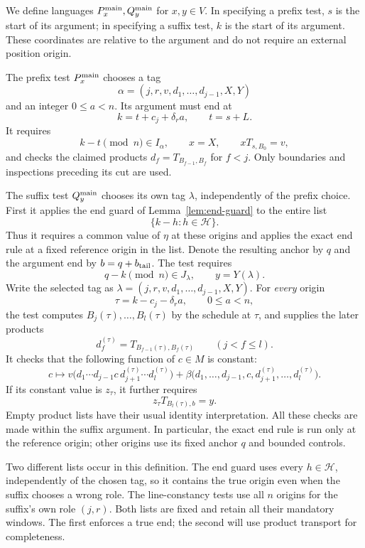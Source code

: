 We define languages $P_x^{\rm main},Q_y^{\rm main}$ for $x,y\in V$.
In specifying a prefix test, $s$ is the start of its argument; in specifying
a suffix test, $k$ is the start of its argument.  These coordinates are
relative to the argument and do not require an external position origin.

The prefix test $P_x^{\rm main}$ chooses a tag
\[
 \alpha=(j,r,v,d_1,\ldots,d_{j-1},X,Y)
\]
and an integer $0\leq a<n$.  Its argument must end at
\[
 k=t+c_j+\delta_r a,\qquad t=s+L.
\]
It requires
\[
 k-t\pmod n\in I_\alpha,\qquad x=X,\qquad xT_{s,B_0}=v,
\]
and checks the claimed products $d_f=T_{B_{f-1},B_f}$ for $f<j$.
Only boundaries and inspections preceding its cut are used.

The suffix test $Q_y^{\rm main}$ chooses its own tag $\lambda$,
independently of the prefix choice.  First it applies the end guard of
Lemma~\ref{lem:end-guard} to the entire list
\[
 \{k-h:h\in\mathcal H\}.
\]
Thus it requires a common value of $\eta$ at these origins and applies
the exact end rule at a fixed reference origin in the list.  Denote the
resulting anchor by $q$ and the argument end by $b=q+b_{\rm tail}$.
The test requires
\[
 q-k\pmod n\in J_\lambda,\qquad y=Y(\lambda).
\]
Write the selected tag as
$\lambda=(j,r,v,d_1,\ldots,d_{j-1},X,Y)$.
For \emph{every} origin
\[
 \tau=k-c_j-\delta_r a,\qquad 0\leq a<n,
\]
the test computes $B_j(\tau),\ldots,B_l(\tau)$ by the schedule at
$\tau$, and supplies the later products
\[
 d_f^{(\tau)}=T_{B_{f-1}(\tau),B_f(\tau)}\qquad(j<f\leq l).
\]
It checks that the following function of $c\in M$ is constant:
\begin{equation}
\label{eq:main-line-test}
 c\longmapsto
 v\bigl(d_1\cdots d_{j-1}c\,d_{j+1}^{(\tau)}\cdots d_l^{(\tau)}\bigr)
 +\beta\bigl(d_1,\ldots,d_{j-1},c,
                   d_{j+1}^{(\tau)},\ldots,d_l^{(\tau)}\bigr).
\end{equation}
If its constant value is $z_\tau$, it further requires
\[
 z_\tau T_{B_l(\tau),b}=y.
\]
Empty product lists have their usual identity interpretation.  All these
checks are made within the suffix argument.  In particular, the exact end
rule is run only at the reference origin; other origins use its fixed
anchor $q$ and bounded controls.

Two different lists occur in this definition. The end guard uses every
$h\in\mathcal H$, independently of the chosen tag, so it contains the true
origin even when the suffix chooses a wrong role. The line-constancy tests
use all $n$ origins for the suffix's own role $(j,r)$. Both lists are fixed
and retain all their mandatory windows. The first enforces a true end;
the second will use product transport for completeness.

